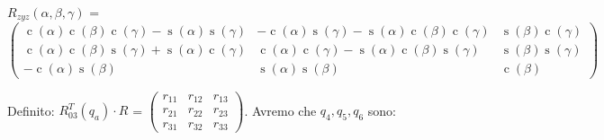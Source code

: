 \documentclass[a4paper,12pt]{article}
\begin{document}
\begin{center}
$ R_{zyz}(\alpha,\beta,\gamma)$ = $\begin{pmatrix}\operatorname{c}\left( \alpha \right)  \operatorname{c}\left( \beta \right)  \operatorname{c}\left( \gamma \right) -\operatorname{s}\left( \alpha \right)  \operatorname{s}\left( \gamma \right)  & -\operatorname{c}\left( \alpha \right)  \operatorname{s}\left( \gamma \right) -\operatorname{s}\left( \alpha \right)  \operatorname{c}\left( \beta \right)  \operatorname{c}\left( \gamma \right)  & \operatorname{s}\left( \beta \right)  \operatorname{c}\left( \gamma \right) \\
\operatorname{c}\left( \alpha \right)  \operatorname{c}\left( \beta \right)  \operatorname{s}\left( \gamma \right) +\operatorname{s}\left( \alpha \right)  \operatorname{c}\left( \gamma \right)  & \operatorname{c}\left( \alpha \right)  \operatorname{c}\left( \gamma \right) -\operatorname{s}\left( \alpha \right)  \operatorname{c}\left( \beta \right)  \operatorname{s}\left( \gamma \right)  & \operatorname{s}\left( \beta \right)  \operatorname{s}\left( \gamma \right) \\
-\operatorname{c}\left( \alpha \right)  \operatorname{s}\left( \beta \right)  & \operatorname{s}\left( \alpha \right)  \operatorname{s}\left( \beta \right)  & \operatorname{c}\left( \beta \right) \end{pmatrix}$
\end{center}


Definito: $R_{03}^T(q_a) \cdot R$ = $\begin{pmatrix}{r_{11}} & {r_{12}} & {r_{13}}\\
{r_{21}} & {r_{22}} & {r_{23}}\\
{r_{31}} & {r_{32}} & {r_{33}}\end{pmatrix}$.
Avremo che $q_4,q_5,q_6$ sono:
\end{document}
